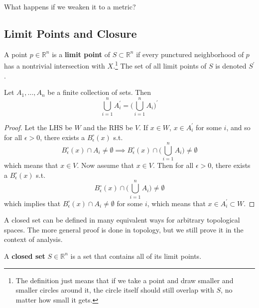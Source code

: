 \documentclass{article}
\begin{document}
    What happens if we weaken it to a metric? 

  \subsection{Limit Points and Closure} 

    \begin{definition}
      A point $p \in \mathbb{R}^n$ is a \textbf{limit point} of $S \subset \mathbb{R}^n$ if every punctured neighborhood of $p$ has a nontrivial intersection with $X$.\footnote{The definition just means that if we take a point and draw smaller and smaller circles around it, the circle itself should still overlap with $S$, no matter how small it gets. } The set of all limit points of $S$ is denoted $S^\prime$. 
    \end{definition}

    \begin{theorem}
      Let $A_1, \ldots, A_n$ be a finite collection of sets. Then 
      \[\bigcup_{i=1}^n A_i^\prime = \bigg( \bigcup_{i=1}^n A_i \bigg)^\prime\]
    \end{theorem}
    \begin{proof}
      Let the LHS be $W$ and the RHS be $V$. If $x \in W$, $x \in A_i^\prime$ for some $i$, and so for all $\epsilon > 0$, there exists a $B_\epsilon^\circ (x)$ s.t. 
      \[B_\epsilon^\circ (x) \cap A_i \neq \emptyset \implies B_\epsilon^\circ (x) \cap \bigg( \bigcup_{i=1}^n A_i \bigg) \neq \emptyset\]
      which means that $x \in V$. Now assume that $x \in V$. Then for all $\epsilon > 0$, there exists a $B_\epsilon^\circ (x)$ s.t. 
      \[B_\epsilon^\circ (x) \cap \bigg( \bigcup_{i=1}^n A_i \bigg) \neq \emptyset\]
      which implies that $B_\epsilon^\circ (x) \cap A_i \neq \emptyset$ for some $i$, which means that $x \in A_i^\prime \subset W$. 
    \end{proof}

    A closed set can be defined in many equivalent ways for arbitrary topological spaces. The more general proof is done in topology, but we still prove it in the context of analysis. 

    \begin{definition}
      A \textbf{closed set} $S \in \mathbb{R}^n$ is a set that contains all of its limit points. 
    \end{definition}
\end{document}
